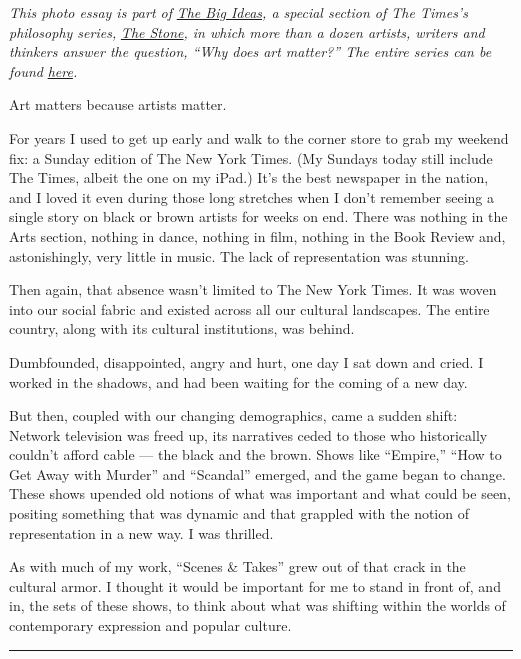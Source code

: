 \emph{This photo essay is part of}
\href{https://www.nytimes.com/spotlight/the-big-ideas}{\emph{The Big
Ideas}}\emph{, a special section of The Times's philosophy series,}
\href{https://www.nytimes.com/column/the-stone?action=click\&module=RelatedLinks\&pgtype=Article}{\emph{The
Stone}}\emph{, in which more than a dozen artists, writers and thinkers
answer the question, ``Why does art matter?'' The entire series can be
found}
\href{https://www.nytimes.com/spotlight/the-big-ideas}{\emph{here}}\emph{.}

Art matters because artists matter.

For years I used to get up early and walk to the corner store to grab my
weekend fix: a Sunday edition of The New York Times. (My Sundays today
still include The Times, albeit the one on my iPad.) It's the best
newspaper in the nation, and I loved it even during those long stretches
when I don't remember seeing a single story on black or brown artists
for weeks on end. There was nothing in the Arts section, nothing in
dance, nothing in film, nothing in the Book Review and, astonishingly,
very little in music. The lack of representation was stunning.

Then again, that absence wasn't limited to The New York Times. It was
woven into our social fabric and existed across all our cultural
landscapes. The entire country, along with its cultural institutions,
was behind.

Dumbfounded, disappointed, angry and hurt, one day I sat down and cried.
I worked in the shadows, and had been waiting for the coming of a new
day.

But then, coupled with our changing demographics, came a sudden shift:
Network television was freed up, its narratives ceded to those who
historically couldn't afford cable --- the black and the brown. Shows
like ``Empire,'' ``How to Get Away with Murder'' and ``Scandal''
emerged, and the game began to change. These shows upended old notions
of what was important and what could be seen, positing something that
was dynamic and that grappled with the notion of representation in a new
way. I was thrilled.

As with much of my work, ``Scenes \& Takes'' grew out of that crack in
the cultural armor. I thought it would be important for me to stand in
front of, and in, the sets of these shows, to think about what was
shifting within the worlds of contemporary expression and popular
culture.

\begin{center}\rule{0.5\linewidth}{\linethickness}\end{center}


